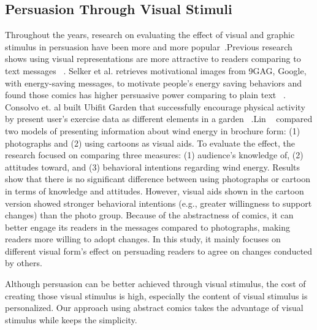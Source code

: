 \subsection{Persuasion Through Visual Stimuli}
Throughout the years, research on evaluating the effect of visual and graphic stimulus in persuasion have been more and more popular~\cite{selker2015sweetbuildinggreeter,consolvo2008activity}.Previous research shows using visual representations are more attractive to readers comparing to text messages ~\cite{selker2015sweetbuildinggreeter,consolvo2008activity}. Selker et al. retrieves motivational images from 9GAG, Google, with energy-saving messages, to motivate people's energy saving behaviors and found those comics has higher persuasive power comparing to plain text ~\cite{selker2015sweetbuildinggreeter}. Consolvo et. al built Ubifit Garden that successfully encourage physical activity by present user's exercise data as different elements in a garden ~\cite{consolvo2008activity}.Lin ~\cite{lin2013impact} compared two models of presenting information about wind energy in brochure form: (1) photographs and (2) using cartoons as visual aids. To evaluate the effect, the research focused on comparing three measures: (1) audience's knowledge of, (2) attitudes toward, and (3) behavioral intentions regarding wind energy. Results show that there is no significant difference between using photographs or cartoon in terms of knowledge and attitudes. However, visual aids shown in the cartoon version showed stronger behavioral intentions (e.g., greater willingness to support changes) than the photo group. Because of the abstractness of comics, it can better engage its readers in the messages compared to photographs, making readers more willing to adopt changes. In this study, it mainly focuses on different visual form's effect on persuading readers to agree on changes conducted by others.

Although persuasion can be better achieved through visual stimulus, the cost of creating those visual stimulus is high, especially the content of visual stimulus is personalized. Our approach using abstract comics takes the advantage of visual stimulus while keeps the simplicity.
